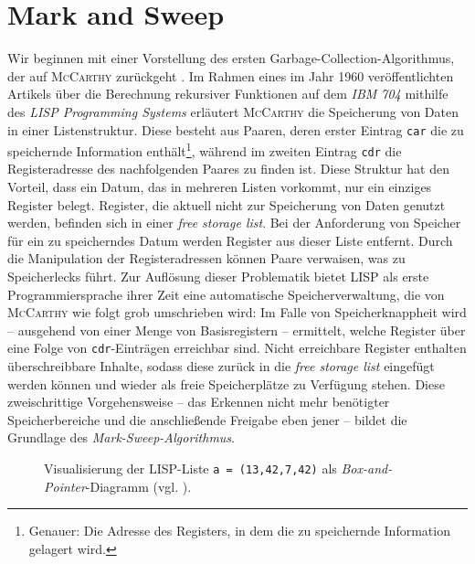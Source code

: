\chapter{Mark and Sweep}
\label{cha:mark-sweep}
Wir beginnen mit einer Vorstellung des ersten Garbage-Collection-Algorithmus, der auf \textsc{McCarthy} zurückgeht \cite[191--193]{mccarthy1960}.
Im Rahmen eines im Jahr 1960 veröffentlichten Artikels über die Berechnung rekursiver Funktionen auf dem \textit{IBM 704} mithilfe des \textit{LISP Programming Systems} erläutert \textsc{McCarthy} die Speicherung von Daten in einer Listenstruktur.
Diese besteht aus Paaren, deren erster Eintrag \texttt{car} die zu speichernde Information enthält\footnote{Genauer: Die Adresse des Registers, in dem die zu speichernde Information gelagert wird.}, während im zweiten Eintrag \texttt{cdr} die Registeradresse des nachfolgenden Paares zu finden ist.
Diese Struktur hat den Vorteil, dass ein Datum, das in mehreren Listen vorkommt, nur ein einziges Register belegt.
Register, die aktuell nicht zur Speicherung von Daten genutzt werden, befinden sich in einer \textit{free storage list}.
Bei der Anforderung von Speicher für ein zu speicherndes Datum werden Register aus dieser Liste entfernt.
Durch die Manipulation der Registeradressen können Paare verwaisen, was zu Speicherlecks führt.
Zur Auflösung dieser Problematik bietet LISP als erste Programmiersprache ihrer Zeit eine automatische Speicherverwaltung, die von \textsc{McCarthy} wie folgt grob umschrieben wird:
Im Falle von Speicherknappheit wird -- ausgehend von einer Menge von Basisregistern -- ermittelt, welche Register über eine Folge von \texttt{cdr}-Einträgen erreichbar sind.
Nicht erreichbare Register enthalten überschreibbare Inhalte, sodass diese zurück in die \textit{free storage list} eingefügt werden können und wieder als freie Speicherplätze zu Verfügung stehen.
Diese zweischrittige Vorgehensweise -- das Erkennen nicht mehr benötigter Speicherbereiche und die anschließende Freigabe eben jener -- bildet die Grundlage des \textit{Mark-Sweep-Algorithmus}.

\begin{figure}[h]
	\centering
	
	\caption[Visualisierung einer LISP-Liste]{Visualisierung der LISP-Liste \texttt{a = (13,42,7,42)} als \textit{Box-and-Pointer}-Diagramm (vgl. \cite[Kapitel 3.3]{sicp}).}
	\label{fig:lisp-list}
\end{figure}




